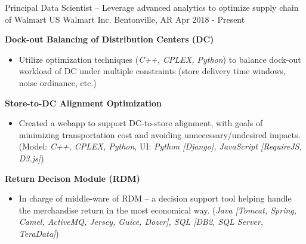 

\begin{cventries}


\cventry
{Principal Data Scientist \tiny{-- Leverage advanced analytics to optimize supply chain of Walmart US}}          %
{Walmart Inc.}                      %
{Bentonville, AR}                   %
{Apr 2018 - Present}                    %
{
    \begin{cvitems}
    \item {
        \textbf{Dock-out Balancing of Distribution Centers (DC)}  
        \begin{itemize}
            \item  Utilize optimization techniques (\textit{C++, CPLEX, Python}) to balance dock-out workload of DC under multiple constraints (store delivery time windows, noise ordinance, etc.) 
        \end{itemize}           
    }
    \item {
        \textbf{Store-to-DC Alignment Optimization} 
        \begin{itemize}
            \item  Created a webapp to support DC-to-store alignment, with goals of minimizing transportation cost and avoiding unnecessary/undesired impacts. 
            (Model: \textit{C++, CPLEX, Python}, UI: \textit{Python [Django], JavaScript [RequireJS, D3.js]}) 
        \end{itemize}           
    }
    \item {
        \textbf{Return Decison Module (RDM)} 
        \begin{itemize}
            \item  In charge of middle-ware of RDM -- a decision support tool helping handle the merchandise return in the most economical way. 
                   (\textit{Java [Tomcat, Spring, Camel, ActiveMQ, Jersey, Guice, Dozer], SQL [DB2, SQL Server, TeraData]})
        \end{itemize}           
    }
    \end{cvitems}%
}


\end{cventries}

